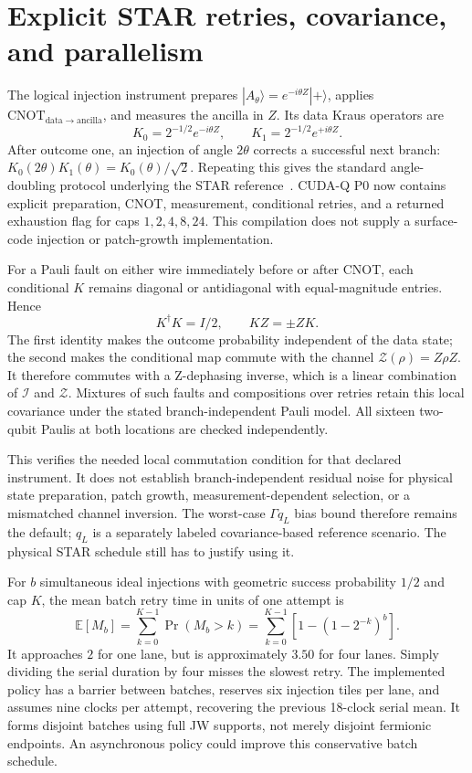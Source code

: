 \documentclass[11pt]{article}
\begin{document}
\section{Explicit STAR retries, covariance, and parallelism}
The logical injection instrument prepares
$|A_\theta\rangle=e^{-i\theta Z}|+\rangle$, applies
$\mathrm{CNOT}_{\mathrm{data}\to\mathrm{ancilla}}$, and measures the ancilla
in $Z$. Its data Kraus operators are
\begin{equation}
 K_0=2^{-1/2}e^{-i\theta Z},\qquad
 K_1=2^{-1/2}e^{+i\theta Z}.
\end{equation}
After outcome one, an injection of angle $2\theta$ corrects a successful
next branch: $K_0(2\theta)K_1(\theta)=K_0(\theta)/\sqrt2$.
Repeating this gives the standard angle-doubling protocol underlying the
STAR reference~\cite{akahoshi,toshio}. CUDA-Q P0 now contains explicit
preparation, CNOT, measurement, conditional retries, and a returned exhaustion
flag for caps $1,2,4,8,24$. This compilation does not supply a surface-code
injection or patch-growth implementation.

For a Pauli fault on either wire immediately before or after CNOT, each
conditional $K$ remains diagonal or antidiagonal with equal-magnitude
entries. Hence
\begin{equation}
 K^\dagger K=I/2,\qquad KZ=\pm ZK.
\end{equation}
The first identity makes the outcome probability independent of the data
state; the second makes the conditional map commute with the channel
$\mathcal Z(\rho)=Z\rho Z$. It therefore commutes with a Z-dephasing inverse,
which is a linear combination of $\mathcal I$ and $\mathcal Z$. Mixtures
of such faults and compositions over retries retain this local covariance
under the stated branch-independent Pauli model. All sixteen two-qubit
Paulis at both locations are checked independently.

This verifies the needed local commutation condition for that declared
instrument. It does not establish branch-independent residual noise for
physical state preparation, patch growth, measurement-dependent selection,
or a mismatched channel inversion. The worst-case $\Gamma q_L$ bias bound
therefore remains the default; $q_L$ is a separately labeled covariance-based
reference scenario. The physical STAR schedule still has to justify using it.

For $b$ simultaneous ideal injections with geometric success probability
$1/2$ and cap $K$, the mean batch retry time in units of one attempt is
\begin{equation}
 \mathbb E[M_b]=\sum_{k=0}^{K-1}\Pr(M_b>k)
 =\sum_{k=0}^{K-1}\left[1-(1-2^{-k})^b\right].
\end{equation}
It approaches $2$ for one lane, but is approximately $3.50$ for four lanes.
Simply dividing the serial duration by four misses the slowest retry. The
implemented policy has a barrier between batches, reserves six injection
tiles per lane, and assumes nine clocks per attempt, recovering the previous
18-clock serial mean. It forms disjoint batches using full JW supports,
not merely disjoint fermionic endpoints. An asynchronous policy could improve
this conservative batch schedule.
\end{document}
